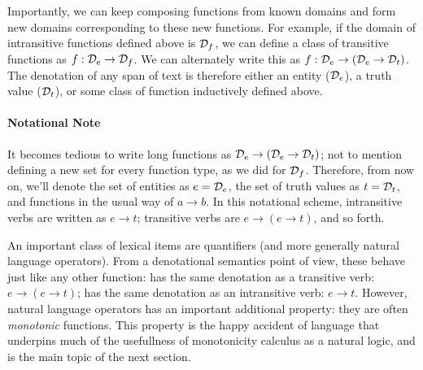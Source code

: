 Importantly, we can keep composing functions from known domains and form new
  domains corresponding to these new functions.
For example, if the domain of intransitive functions defined above is $\mathcal{D}_f$,
  we can define a class of transitive functions as $f : \mathcal{D}_e \rightarrow \mathcal{D}_f$.
We can alternately write this as $f : \mathcal{D}_e \rightarrow (\mathcal{D}_e \rightarrow \mathcal{D}_t)$.
The denotation of any span of text is therefore either an entity ($\mathcal{D}_e$), a truth
  value ($\mathcal{D}_t$), or some class of function inductively defined above.

\paragraph{Notational Note}
It becomes tedious to write long functions as $\mathcal{D}_e \rightarrow (\mathcal{D}_e \rightarrow \mathcal{D}_t)$;
  not to mention defining a new set for every function type, as we did for $\mathcal{D}_f$.
Therefore, from now on, we'll denote the set of entities as $e = \mathcal{D}_e$, the set of truth values as 
  $t = \mathcal{D}_t$, and functions in the usual way of $a \rightarrow b$.
In this notational scheme, intransitive verbs are written as $e \rightarrow t$; transitive
  verbs are $e \rightarrow (e \rightarrow t)$, and so forth.



An important class of lexical items are quantifiers (and more generally natural language
  operators).
From a denotational semantics point of view, these behave just like any other function:
   has the same denotation as a transitive verb: $e \rightarrow (e \rightarrow t)$;
   has the same denotation as an intransitive verb: $e \rightarrow t$.
However, natural language operators has an important additional property: they are often
  \textit{monotonic} functions.
This property is the happy accident of language that underpins much of the usefullness
  of monotonicity calculus as a natural logic, and is the main topic of the next section.






